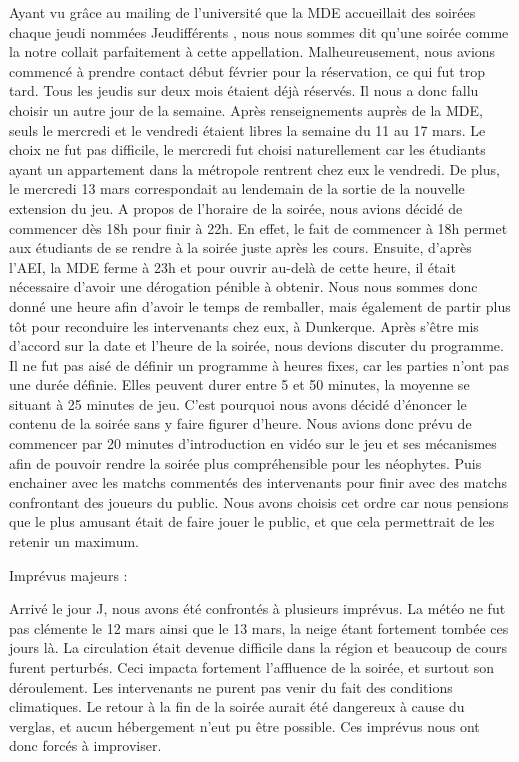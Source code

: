 Ayant vu grâce au mailing de l’université que la MDE accueillait des soirées chaque jeudi
nommées \og Jeudifférents \fg{}, nous nous sommes dit qu’une soirée comme la notre collait
parfaitement à cette appellation. Malheureusement, nous avions commencé à prendre contact
début février pour la réservation, ce qui fut trop tard. Tous les jeudis sur deux mois étaient
déjà réservés.
Il nous a donc fallu choisir un autre jour de la semaine. Après renseignements auprès de la
MDE, seuls le mercredi et le vendredi étaient libres la semaine du 11 au 17 mars. Le choix ne
fut pas difficile, le mercredi fut choisi naturellement car les étudiants ayant un appartement
dans la métropole rentrent chez eux le vendredi. De plus, le mercredi 13 mars correspondait
au lendemain de la sortie de la nouvelle extension du jeu.
A propos de l’horaire de la soirée, nous avions décidé de commencer dès 18h pour finir à
22h. En effet, le fait de commencer à 18h permet aux étudiants de se rendre à la soirée juste
après les cours. Ensuite, d’après l’AEI, la MDE ferme à 23h et pour ouvrir au-delà de cette
heure, il était nécessaire d’avoir une dérogation pénible à obtenir. Nous nous sommes donc
donné une heure afin d’avoir le temps de remballer, mais également de partir plus tôt pour
reconduire les intervenants chez eux, à Dunkerque.
Après s’être mis d’accord sur la date et l’heure de la soirée, nous devions discuter du
programme.
Il ne fut pas aisé de définir un programme à heures fixes, car les parties n’ont pas une durée
définie. Elles peuvent durer entre 5 et 50 minutes, la moyenne se situant à 25 minutes de jeu.
C’est pourquoi nous avons décidé d’énoncer le contenu de la soirée sans y faire figurer
d’heure.
Nous avions donc prévu de commencer par 20 minutes d’introduction en vidéo sur le jeu et
ses mécanismes afin de pouvoir rendre la soirée plus compréhensible pour les néophytes.
Puis enchainer avec les matchs commentés des intervenants pour finir avec des matchs
confrontant des joueurs du public. Nous avons choisis cet ordre car nous pensions que le plus
amusant était de faire jouer le public, et que cela permettrait de les retenir un maximum.

Imprévus majeurs :

Arrivé le jour J, nous avons été confrontés à plusieurs imprévus.
La météo ne fut pas clémente le 12 mars ainsi que le 13 mars, la neige étant fortement
tombée ces jours là. La circulation était devenue difficile dans la région et beaucoup de cours
furent perturbés.
Ceci impacta fortement l’affluence de la soirée, et surtout son déroulement. Les intervenants
ne purent pas venir du fait des conditions climatiques. Le retour à la fin de la soirée aurait été
dangereux à cause du verglas, et aucun hébergement n’eut pu être possible.
Ces imprévus nous ont donc forcés à improviser.

